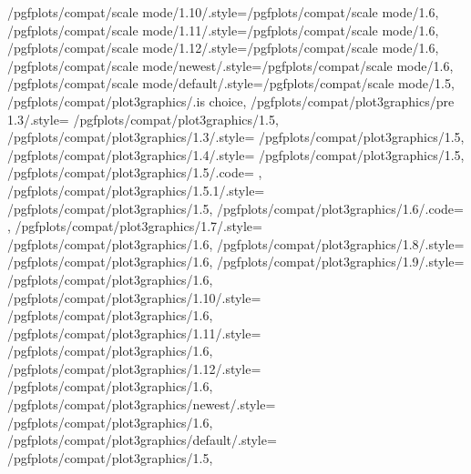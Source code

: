 {	/pgfplots/compat/scale mode/1.10/.style={/pgfplots/compat/scale mode/1.6},
	/pgfplots/compat/scale mode/1.11/.style={/pgfplots/compat/scale mode/1.6},
	/pgfplots/compat/scale mode/1.12/.style={/pgfplots/compat/scale mode/1.6},
	/pgfplots/compat/scale mode/newest/.style={/pgfplots/compat/scale mode/1.6},
	/pgfplots/compat/scale mode/default/.style={/pgfplots/compat/scale mode/1.5},
	/pgfplots/compat/plot3graphics/.is choice,
	/pgfplots/compat/plot3graphics/pre 1.3/.style=	{/pgfplots/compat/plot3graphics/1.5},
	/pgfplots/compat/plot3graphics/1.3/.style=		{/pgfplots/compat/plot3graphics/1.5},
	/pgfplots/compat/plot3graphics/1.4/.style=		{/pgfplots/compat/plot3graphics/1.5},%
	/pgfplots/compat/plot3graphics/1.5/.code=		{\def\b@pgfplots@compat@plot@graphics@threedim{1}},%
	/pgfplots/compat/plot3graphics/1.5.1/.style=	{/pgfplots/compat/plot3graphics/1.5},%
	/pgfplots/compat/plot3graphics/1.6/.code=		{\def\b@pgfplots@compat@plot@graphics@threedim{2}},%
	/pgfplots/compat/plot3graphics/1.7/.style=	{/pgfplots/compat/plot3graphics/1.6},%
	/pgfplots/compat/plot3graphics/1.8/.style=	{/pgfplots/compat/plot3graphics/1.6},%
	/pgfplots/compat/plot3graphics/1.9/.style=	{/pgfplots/compat/plot3graphics/1.6},%
	/pgfplots/compat/plot3graphics/1.10/.style=	{/pgfplots/compat/plot3graphics/1.6},%
	/pgfplots/compat/plot3graphics/1.11/.style=	{/pgfplots/compat/plot3graphics/1.6},%
	/pgfplots/compat/plot3graphics/1.12/.style=	{/pgfplots/compat/plot3graphics/1.6},%
	/pgfplots/compat/plot3graphics/newest/.style=	{/pgfplots/compat/plot3graphics/1.6},%
	/pgfplots/compat/plot3graphics/default/.style=	{/pgfplots/compat/plot3graphics/1.5},%
}
